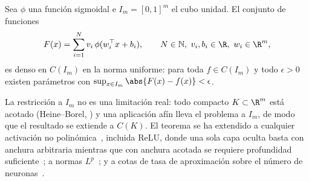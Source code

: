 \begin{theorem}
\label{thm:found:universal}
Sea $\phi$ una funci\'on sigmoidal e $I_m = [0,1]^m$ el cubo unidad. El conjunto de
funciones
\[
  F(x) = \sum_{i=1}^N v_i\, \phi(w_i^\top x + b_i), \qquad
  N \in \mathbb{N},\ v_i, b_i \in \R,\ w_i \in \R^m,
\]
es denso en $C(I_m)$ en la norma uniforme: para toda $f \in C(I_m)$ y todo
$\epsilon > 0$ existen par\'ametros con
$\sup_{x \in I_m} \abs{F(x) - f(x)} < \epsilon$.
\end{theorem}

La restricci\'on a $I_m$ no es una limitaci\'on real: todo compacto $K \subset \R^m$
est\'a acotado (Heine--Borel, ) y una aplicaci\'on af\'in lleva el
problema a $I_m$, de modo que el resultado se extiende a $C(K)$. El teorema se ha
extendido a cualquier activaci\'on no polin\'omica~\citep{leshno1993multilayer},
incluida ReLU, donde una sola capa oculta basta con anchura arbitraria mientras que
con anchura acotada se requiere profundidad
suficiente~\citep{lu2017expressive,hanin2019universal}; a normas
$L^p$~\citep{hornik1991approximation}; y a cotas de tasa de aproximaci\'on sobre el
n\'umero de neuronas~\citep{barron1993universal}.


